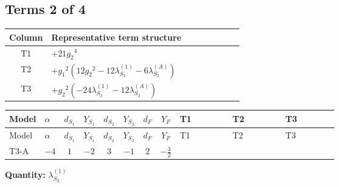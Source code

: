 \documentclass[8pt]{article}
\begin{document}
\begin{landscape}
\subsection*{Terms 2 of 4}
\begin{center}
\begin{tabular}{@{}c >{\raggedright\arraybackslash}p{0.82\linewidth}@{}}
\toprule
Column & Representative term structure \\
\midrule
T1 & \(\displaystyle +21 {g_2}^4\) \\
\midrule
T2 & \(\displaystyle +{g_1}^2 \left(12 {g_2}^2-12 {\lambda_{S_2}^{(1)}}-6 {\lambda_{S_2}^{(A)}}\right)\) \\
\midrule
T3 & \(\displaystyle +{g_2}^2 (-24 {\lambda_{S_2}^{(1)}}-12 {\lambda_{S_2}^{(A)}})\) \\
\midrule
\bottomrule
\end{tabular}
\end{center}
\smallskip
\tiny
\begin{longtable}{@{}llcccccc >{\raggedright\arraybackslash}p{0.21\linewidth} >{\raggedright\arraybackslash}p{0.21\linewidth} >{\raggedright\arraybackslash}p{0.21\linewidth}@{}}
\toprule
Model & $\alpha$ & $d_{S_1}$ & $Y_{S_1}$ & $d_{S_2}$ & $Y_{S_2}$ & $d_F$ & $Y_F$ & T1 & T2 & T3 \\
\midrule
\endfirsthead
\toprule
Model & $\alpha$ & $d_{S_1}$ & $Y_{S_1}$ & $d_{S_2}$ & $Y_{S_2}$ & $d_F$ & $Y_F$ & T1 & T2 & T3 \\
\midrule
\endhead
T3-A & $-4$ & $1$ & $-2$ & $3$ & $-1$ & $2$ & $-\frac{3}{2}$ & \scriptsize\adjustbox{max width=\linewidth}{$\begin{gathered} +21 {g_2}^4\end{gathered}$} & \scriptsize\adjustbox{max width=\linewidth}{$\begin{gathered} +{g_1}^2 \left(12 {g_2}^2-12 {\lambda_{S_2}^{(1)}}-6 {\lambda_{S_2}^{(A)}}\right)\end{gathered}$} & \scriptsize\adjustbox{max width=\linewidth}{$\begin{gathered} +{g_2}^2 (-24 {\lambda_{S_2}^{(1)}}-12 {\lambda_{S_2}^{(A)}})\end{gathered}$} \\
\midrule
\bottomrule
\end{longtable}
\clearpage
\noindent\textbf{Quantity: }$\lambda_{S_2}^{(1)}$\par\smallskip

\end{landscape}
\end{document}
